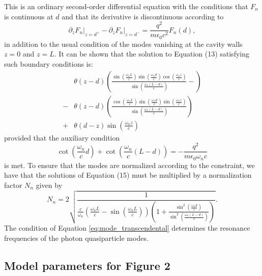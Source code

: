 \documentclass[aps,prb,onecolumn,preprint,
	groupedaddress,superscriptaddress,
	amsfonts,amssymb,amsmath,floatfix,
	citeautoscript]{revtex4-1}
\begin{document}
This is an ordinary second-order differential equation with the conditions that $F_n$ is continuous at $d$ and that its derivative is discontinuous according to 
\begin{equation}\label{eq:boundary_condition}
\partial_zF_n\Big|_{z=d^+}-\partial_zF_n\Big|_{z=d^-} = \frac{q^2}{m\epsilon_0 c^2}F_n(d),
\end{equation}
in addition to the usual condition of the modes vanishing at the cavity walls $z=0$ and $z=L$. It can be shown that the solution to Equation (13) satisfying such boundary conditions is:
\begin{align}\label{eq:field_mode}
&\theta (z-d) \left(\frac{\sin\left(\frac{\omega_nL}{c}\right)\sin\left(\frac{\omega_nd}{c}\right)\cos\left(\frac{\omega_nz}{c}\right)}{\sin\left(\frac{\omega_n(L-d)}{c}\right)}-\right) \nonumber \\ 
-&\theta (z-d) \left(\frac{\cos\left(\frac{\omega_nL}{c}\right)\sin\left(\frac{\omega_nd}{c}\right)\sin\left(\frac{\omega_nz}{c}\right)}{\sin\left(\frac{\omega_n(L-d)}{c}\right)}\right) \nonumber \\ 
+&\theta (d-z) \sin\left(\frac{\omega_n z}{c} \right)
\end{align}
provided that the auxiliary condition
\begin{equation}\label{eq:mode_transcendental}
\cot\left(\frac{\omega_n}{c}d \right)+\cot\left(\frac{\omega_n}{c}(L-d) \right) = -\frac{q^2}{m\epsilon_0\omega_nc}
\end{equation}
is met. To ensure that the modes are normalized according to the constraint, we have that the solutions of Equation (15) must be multiplied by a normalization factor $N_n$ given by
\begin{equation}\label{eq:mode_normalization}
N_n = 2\sqrt{\frac{1}{\frac{c}{\omega_n}\left(\frac{\omega_nL}{c}-\sin\left(\frac{\omega_nL}{c}\right) \right)\left(1+\frac{\sin^2\left(\frac{\omega_nd}{c}\right)}{\sin^2\left(\frac{\omega_n(L-d)}{c}\right)} \right)}}.
\end{equation}
The condition of Equation \ref{eq:mode_transcendental} determines the resonance frequencies of the photon quasiparticle modes. 

\subsection{Model parameters for Figure 2}
\end{document}
